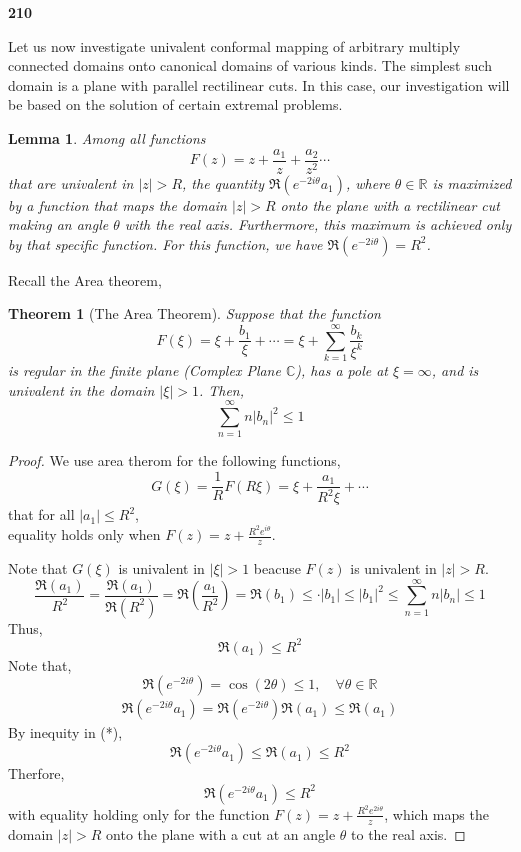 \documentclass[
]{book}
\newtheorem{theorem}{Theorem}[chapter]
\newtheorem{lemma}{Lemma}[chapter]
\theoremstyle{definition}
\theoremstyle{definition}
\theoremstyle{definition}
\theoremstyle{definition}
\theoremstyle{remark}
\begin{document}
\textbf{210}

Let us now investigate univalent conformal mapping of arbitrary multiply connected domains onto canonical domains of various kinds. The simplest such domain is a plane with parallel rectilinear cuts. In this case, our investigation will be based on the solution of certain extremal problems.

\begin{lemma}
\protect\hypertarget{lem:unnamed-chunk-13}{}\label{lem:unnamed-chunk-13}Among all functions
\[F(z) = z + \frac{a_1}{z}+\frac{a_2}{z^2} \cdots\]
that are univalent in \(|z| > R\), the quantity \(\Re(e^{-2i\theta}a_1)\), where \(\theta\in \mathbb{R}\) is maximized by a function that maps the domain \(|z| > R\) onto the plane with a rectilinear cut making an angle \(\theta\) with the real axis. Furthermore, this maximum is achieved only by that specific function. For this function, we have \(\Re(e^{-2i\theta}) = R^2\).
\end{lemma}

Recall the Area theorem,

\begin{theorem}[The Area Theorem]
\protect\hypertarget{thm:unnamed-chunk-14}{}\label{thm:unnamed-chunk-14}Suppose that the function
\[F(\xi) = \xi+\frac{b_1}{\xi}+\cdots=\xi + \sum_{k=1}^{\infty} \frac{b_k}{ \xi^k}\]
is regular in the finite plane (Complex Plane \(\mathbb{C}\)), has a pole at \(\xi = \infty\), and is univalent in the domain \(|\xi| > 1\). Then,
\[ \sum_{n=1}^{\infty}n|b_n|^2\leq 1\]
\end{theorem}

\begin{proof}
We use area therom for the following functions,
\[G(\xi)=\frac{1}{R}F(R\xi)=\xi+\frac{a_1}{R^2\xi}+\cdots\]
that for all \(|a_1|\leq R^2\),\\
equality holds only when \(F(z) = z + \frac{R^2 e^{i\theta}}{z}\).

Note that \(G(\xi)\) is univalent in \(|\xi|>1\) beacuse \(F(z)\) is univalent in \(|z|>R\).
\[\frac{\Re(a_1)}{R^2}=\frac{\Re(a_1)}{\Re(R^2)}=\Re\left(\frac{a_1}{R^2}\right)=\Re(b_1)\leq \cdot |b_1|\leq |b_1|^2 \leq \sum_{n=1}^\infty n|b_n|\leq 1\]
Thus,
\[{\Re(a_1)}\leq {R^2}\tag{*}\]
Note that,
\[\Re(e^{-2i\theta})=\cos(2\theta)\leq 1,\quad \forall \theta \in \mathbb{R}\]
\begin{eqnarray*}
\Re(e^{-2i\theta}a_1)=\Re(e^{-2i\theta})\Re(a_1)\leq \Re(a_1)
\end{eqnarray*}
By inequity in (*),
\[ \Re(e^{-2i\theta} a_1) \leq \Re(a_1)\leq R^2 \]
Therfore,
\[\Re(e^{-2i\theta} a_1) \leq R^2\]
with equality holding only for the function \(F(z) = z + \frac{R^2 e^{2i\theta}}{ z}\), which maps the domain \(|z| > R\) onto the plane with a cut at an angle \(\theta\) to the real axis.
\end{proof}
\end{document}
